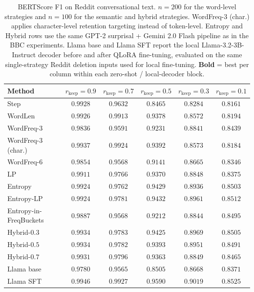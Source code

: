 \documentclass[11pt]{article}
\newcommand{\rkeep}{r_{\mathrm{keep}}}
\begin{document}
\begin{table}[tbp]
\centering
\small
\caption{BERTScore F1 on Reddit conversational text.
$n{=}200$ for the word-level strategies and $n{=}100$ for the semantic and hybrid strategies.
WordFreq-3 (char.) applies character-level retention targeting instead of token-level.
Entropy and Hybrid rows use the same GPT-2 surprisal + Gemini 2.0 Flash pipeline as in the
BBC experiments. Llama base and Llama SFT report the local Llama-3.2-3B-Instruct decoder before and after QLoRA fine-tuning, evaluated on the same single-strategy Reddit deletion inputs used for local fine-tuning.
\textbf{Bold} = best per column within each zero-shot / local-decoder block.}
\label{tab:reddit_bertscore}
\begin{tabular}{lccccc}
\toprule
\textbf{Method} & $\rkeep{=}0.9$ & $\rkeep{=}0.7$ & $\rkeep{=}0.5$ & $\rkeep{=}0.3$ & $\rkeep{=}0.1$ \\
\midrule
Step              & $0.9928$ & $0.9632$ & $0.8465$ & $0.8284$ & $0.8161$ \\
WordLen           & $0.9926$ & $0.9913$ & $0.9378$ & $0.8572$ & $0.8194$ \\
WordFreq-3         & $0.9836$ & $0.9591$ & $0.9231$ & $0.8841$ & $0.8439$ \\
WordFreq-3 (char.) & $\mathbf{0.9937}$ & $\mathbf{0.9924}$ & $0.9392$ & $0.8573$ & $0.8184$ \\
WordFreq-6         & $0.9854$ & $0.9568$ & $0.9141$ & $0.8665$ & $0.8346$ \\
LP            & $0.9911$ & $0.9766$ & $0.9370$ & $0.8848$ & $0.8375$ \\
Entropy           & $0.9924$ & $0.9762$ & $0.9429$ & $0.8936$ & $0.8503$ \\
Entropy-LP        & $0.9924$ & $0.9781$ & $\mathbf{0.9432}$ & $0.8961$ & $\mathbf{0.8512}$ \\
Entropy-in-FreqBuckets & $0.9887$ & $0.9568$ & $0.9212$ & $0.8844$ & $0.8495$ \\
Hybrid-$0.3$      & $0.9934$ & $0.9783$ & $0.9425$ & $\mathbf{0.8969}$ & $0.8505$ \\
Hybrid-$0.5$      & $0.9934$ & $0.9782$ & $0.9393$ & $0.8951$ & $0.8491$ \\
Hybrid-$0.7$      & $0.9931$ & $0.9796$ & $0.9363$ & $0.8849$ & $0.8465$ \\
\midrule
Llama base      & $0.9780$ & $0.9565$ & $0.8505$ & $0.8668$ & $0.8371$ \\
Llama SFT       & $\mathbf{0.9946}$ & $\mathbf{0.9927}$ & $\mathbf{0.9590}$ & $\mathbf{0.9019}$ & $\mathbf{0.8525}$ \\
\bottomrule
\end{tabular}
\end{table}
\end{document}
